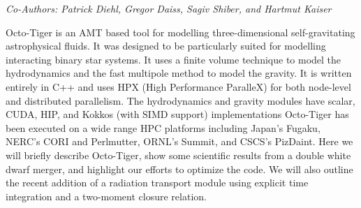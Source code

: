 \begin{center}
\textit{Co-Authors: Patrick	Diehl, Gregor Daiss, Sagiv	Shiber, and Hartmut Kaiser}
\end{center} 
Octo-Tiger is an AMT based tool for modelling three-dimensional self-gravitating astrophysical fluids. It was designed to be particularly suited for modelling interacting binary star systems. It uses a finite volume technique to model the hydrodynamics and the fast multipole method to model the gravity. It is written entirely in C++ and uses HPX (High Performance ParalleX) for both node-level and distributed parallelism. The hydrodynamics and gravity modules have scalar, CUDA, HIP, and Kokkos (with SIMD support) implementations Octo-Tiger has been executed on a wide range HPC platforms including Japan's Fugaku, NERC's CORI and Perlmutter, ORNL's Summit, and CSCS's PizDaint. Here we will briefly describe Octo-Tiger, show some scientific results from a double white dwarf merger, and highlight our efforts to
optimize the code. We will also outline the recent addition of a radiation transport module using explicit time integration and a two-moment
closure relation.